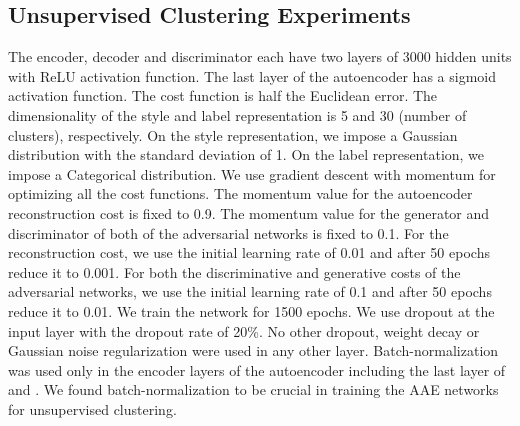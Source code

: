 \documentclass{article}
\begin{document}
\begin{appendices}
\subsection{Unsupervised Clustering Experiments}
The encoder, decoder and discriminator each have two layers of 3000 hidden units with ReLU activation function. The last layer of the autoencoder has a sigmoid activation function. The cost function is half the Euclidean error. The dimensionality of the style and label representation is 5 and 30 (number of clusters), respectively. On the style representation, we impose a Gaussian distribution with the standard deviation of 1. On the label representation, we impose a Categorical distribution. We use gradient descent with momentum for optimizing all the cost functions. The momentum value for the autoencoder reconstruction cost is fixed to 0.9. The momentum value for the generator and discriminator of both of the adversarial networks is fixed to 0.1. For the reconstruction cost, we use the initial learning rate of 0.01 and after 50 epochs reduce it to 0.001. For both the discriminative and generative costs of the adversarial networks, we use the initial learning rate of 0.1 and after 50 epochs reduce it to 0.01. We train the network for 1500 epochs. We use dropout at the input layer with the dropout rate of 20\%. No other dropout,  weight decay or Gaussian noise regularization were used in any other layer. Batch-normalization was used only in the encoder layers of the autoencoder including the last layer of  and . We found batch-normalization \citep{batch} to be crucial in training the AAE networks for unsupervised clustering.

\end{appendices}
\end{document}
